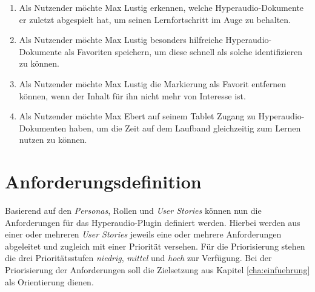 \begin{enumerate}[label=US-\arabic*:,ref=US-\arabic*]
\item \label{US-Uebersicht-Letzte} Als Nutzender möchte Max Lustig erkennen, welche Hyperaudio-Dokumente er zuletzt abgespielt hat, um seinen Lernfortschritt im Auge zu behalten.

\item \label{US-Favoriten} Als Nutzender möchte Max Lustig besonders hilfreiche Hyperaudio-Dokumente als Favoriten speichern, um diese schnell als solche identifizieren zu können.

\item \label{US-Favoriten-Loeschen} Als Nutzender möchte Max Lustig die Markierung als Favorit entfernen können, wenn der Inhalt für ihn nicht mehr von Interesse ist.

\item \label{US-Zeit-Mobil} Als Nutzender möchte Max Ebert auf seinem Tablet Zugang zu Hyperaudio-Dokumenten haben, um die Zeit auf dem Laufband gleichzeitig zum Lernen nutzen zu können.

\end{enumerate}


%
%
%
%


\section{Anforderungsdefinition}
\label{sec:anforderungsdefinition}
Basierend auf den \textit{Personas}, Rollen und \textit{User Stories} können nun die Anforderungen für das Hyperaudio-Plugin definiert werden. Hierbei werden aus einer oder mehreren \textit{User Stories} jeweils eine oder mehrere Anforderungen abgeleitet und zugleich mit einer Priorität versehen. Für die Priorisierung stehen die drei Prioritätsstufen \textit{niedrig}, \textit{mittel} und \textit{hoch} zur Verfügung. Bei der Priorisierung der Anforderungen soll die Zielsetzung aus Kapitel \ref{cha:einfuehrung} als Orientierung dienen.

